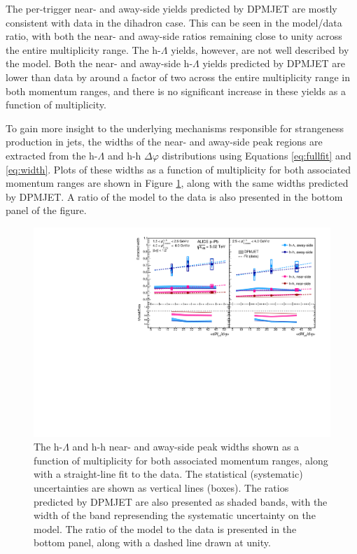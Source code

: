 The per-trigger near- and away-side yields predicted by DPMJET are mostly consistent with data in the dihadron case. This can be seen in the model/data ratio, with both the near- and away-side ratios remaining close to unity across the entire multiplicity range. The h-$\Lambda$ yields, however, are not well described by the model. Both the near- and away-side h-$\Lambda$ yields predicted by DPMJET are lower than data by around a factor of two across the entire multiplicity range in both momentum ranges, and there is no significant increase in these yields as a function of multiplicity. 

To gain more insight to the underlying mechanisms responsible for strangeness production in jets, the widths of the near- and away-side peak regions are extracted from the h-$\Lambda$ and h-h $\Delta\varphi$ distributions using Equations \ref{eq:fullfit} and \ref{eq:width}. Plots of these widths as a function of multiplicity for both associated momentum ranges are shown in Figure \ref{fig:jet_widths}, along with the same widths predicted by DPMJET. A ratio of the model to the data is also presented in the bottom panel of the figure.

\begin{figure}[h!]
\centering
\includegraphics[width=\textwidth]{figures/results/final_width_plot_new_x_axis_model_ratio.pdf}
\caption{The h-$\Lambda$ and h-h near- and away-side peak widths shown as a function of multiplicity for both associated momentum ranges, along with a straight-line fit to the data. The statistical (systematic) uncertainties are shown as vertical lines (boxes). The ratios predicted by DPMJET are also presented as shaded bands, with the width of the band represending the systematic uncertainty on the model. The ratio of the model to the data is presented in the bottom panel, along with a dashed line drawn at unity.}
\label{fig:jet_widths}
\end{figure}


